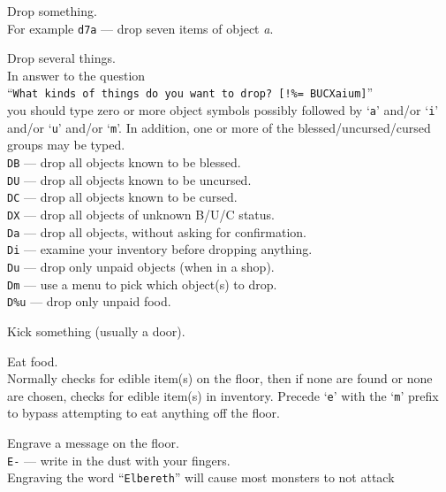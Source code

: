 \item[\tb{d}]
Drop something.\\
For example {\tt d7a} --- drop seven items of object
{\it a}.
\item[\tb{D}]
Drop several things.\\
In answer to the question\\
``{\tt What kinds of things do you want to drop? [!\%= BUCXaium]}''\\
you should type zero or more object symbols possibly followed by
`{\tt a}' and/or `{\tt i}' and/or `{\tt u}' and/or `{\tt m}'.
In addition, one or more of
the bless\-ed/\-un\-curs\-ed/\-curs\-ed groups may be typed.\\
{\tt DB}  --- drop all objects known to be blessed.\\
{\tt DU}  --- drop all objects known to be uncursed.\\
{\tt DC}  --- drop all objects known to be cursed.\\
{\tt DX}  --- drop all objects of unknown B/U/C status.\\
{\tt Da}  --- drop all objects, without asking for confirmation.\\
{\tt Di}  --- examine your inventory before dropping anything.\\
{\tt Du}  --- drop only unpaid objects (when in a shop).\\
{\tt Dm}  --- use a menu to pick which object(s) to drop.\\
{\tt D\%u} --- drop only unpaid food.
\item[\tb{\^{}D}]
Kick something (usually a door).
\item[\tb{e}]
Eat food.\\
Normally checks for edible item(s) on the floor, then if none are found
or none are chosen, checks for edible item(s) in inventory.
Precede `{\tt e}' with the `{\tt m}' prefix to bypass attempting to eat
anything off the floor.
\item[\tb{E}]
Engrave a message on the floor.\\
{\tt E-} --- write in the dust with your fingers.\\
Engraving the word ``{\tt Elbereth}'' will cause most monsters to not attack

